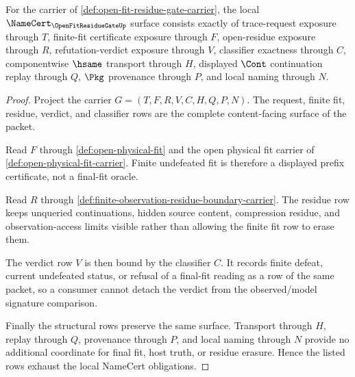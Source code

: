 \begin{theorem}
\label{thm:open-fit-residue-gate-namecert-obligations}
For the carrier of \autoref{def:open-fit-residue-gate-carrier}, the local $\NameCert_{\OpenFitResidueGateUp}$ surface consists exactly of trace-request exposure through $T$, finite-fit certificate exposure through $F$, open-residue exposure through $R$, refutation-verdict exposure through $V$, classifier exactness through $C$, componentwise $\hsame$ transport through $H$, displayed $\Cont$ continuation replay through $Q$, $\Pkg$ provenance through $P$, and local naming through $N$.
\end{theorem}
\begin{proof}
Project the carrier $G=(T,F,R,V,C,H,Q,P,N)$. The request, finite fit, residue, verdict, and classifier rows are the complete content-facing surface of the packet.

Read $F$ through \autoref{def:open-physical-fit} and the open physical fit carrier of \autoref{def:open-physical-fit-carrier}. Finite undefeated fit is therefore a displayed prefix certificate, not a final-fit oracle.

Read $R$ through \autoref{def:finite-observation-residue-boundary-carrier}. The residue row keeps unqueried continuations, hidden source content, compression residue, and observation-access limits visible rather than allowing the finite fit row to erase them.

The verdict row $V$ is then bound by the classifier $C$. It records finite defeat, current undefeated status, or refusal of a final-fit reading as a row of the same packet, so a consumer cannot detach the verdict from the observed/model signature comparison.

Finally the structural rows preserve the same surface. Transport through $H$, replay through $Q$, provenance through $P$, and local naming through $N$ provide no additional coordinate for final fit, host truth, or residue erasure. Hence the listed rows exhaust the local NameCert obligations.
\end{proof}

